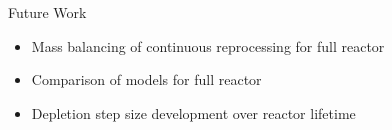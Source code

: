 \documentclass[final]{beamer}
\newlength{\sepwid}
\newlength{\onecolwid}
\newlength{\threecolwid}
\begin{document}
\begin{frame}[t]
\begin{columns}[t,totalwidth=\threecolwid]
\begin{column}{\onecolwid}
\begin{alertblock}{Future Work }
\begin{itemize}
		\item Mass balancing of continuous reprocessing for full reactor
		\item Comparison of models for full reactor
		\item Depletion step size development over reactor lifetime
\end{itemize}

\end{alertblock}





%
%
%
%
% 
%
%

\end{column} %

\begin{column}{\sepwid}\end{column} %



\begin{column}{\onecolwid} %


\end{column}
\end{columns}
\end{frame}
\end{document}
